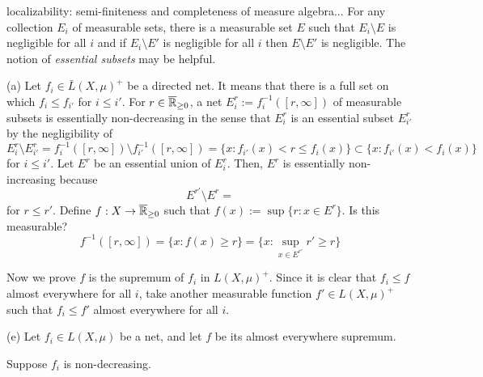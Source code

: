 \documentclass{../../large}
\begin{document}
\begin{pf}

localizability: semi-finiteness and completeness of measure algebra...
For any collection $E_i$ of measurable sets, there is a measurable set $E$ such that $E_i\setminus E$ is negligible for all $i$ and if $E_i\setminus E'$ is negligible for all $i$ then $E\setminus E'$ is negligible.
The notion of \emph{essential subsets} may be helpful.

(a)
Let $f_i\in\bar L(X,\mu)^+$ be a directed net.
It means that there is a full set on which $f_i\le f_{i'}$ for $i\le i'$.
For $r\in\overline{\mathbb{R}}_{\ge0}$, a net $E_i^r:=f_i^{-1}([r,\infty])$ of measurable subsets is essentially non-decreasing in the sense that $E_i^r$ is an essential subset $E_{i'}^r$ by the negligibility of
\[E_i^r\setminus E_{i'}^r=f_i^{-1}([r,\infty])\setminus f_{i'}^{-1}([r,\infty])=\{x:f_{i'}(x)<r\le f_i(x)\}\subset\{x:f_{i'}(x)<f_i(x)\}\]
for $i\le i'$.
Let $E^r$ be an essential union of $E_i^r$.
Then, $E^r$ is essentially non-increasing because
\[E^{r'}\setminus E^r=\]
for $r\le r'$.
Define $f:X\to\overline{\mathbb{R}}_{\ge0}$ such that $f(x):=\sup\{r:x\in E^r\}$.
Is this measurable?
\[f^{-1}([r,\infty])=\{x:f(x)\ge r\}=\{x:\sup_{x\in E^{r'}}r'\ge r\}\]

Now we prove $f$ is the supremum of $f_i$ in $L(X,\mu)^+$.
Since it is clear that $f_i\le f$ almost everywhere for all $i$, take another measurable function $f'\in L(X,\mu)^+$ such that $f_i\le f'$ almost everywhere for all $i$.


(e)
Let $f_i\in L(X,\mu)$ be a net, and let $f$ be its almost everywhere supremum.

Suppose $f_i$ is non-decreasing.


\end{pf}
\end{document}
